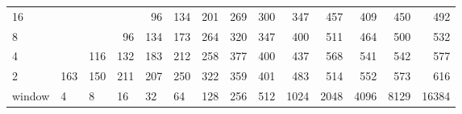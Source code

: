 \begin{table}[h]
{\begin{tabular}{lrrrrrrrrrrrrr}
			\multicolumn{1}{|l|}{16} &  &  &  & \cellcolor[HTML]{99E600}96 & \cellcolor[HTML]{99E600}134 & \cellcolor[HTML]{E69900}201 & \cellcolor[HTML]{E69900}269 & \cellcolor[HTML]{E60000}300 & \cellcolor[HTML]{E60000}347 & \cellcolor[HTML]{9900E6}457 & \cellcolor[HTML]{9900E6}409 & \cellcolor[HTML]{9900E6}450 & \cellcolor[HTML]{9900E6}492 \\ \cline{1-1}
			\multicolumn{1}{|l|}{8} &  &  & \cellcolor[HTML]{99E600}96 & \cellcolor[HTML]{99E600}134 & \cellcolor[HTML]{99E600}173 & \cellcolor[HTML]{E69900}264 & \cellcolor[HTML]{E60000}320 & \cellcolor[HTML]{E60000}347 & \cellcolor[HTML]{9900E6}400 & \cellcolor[HTML]{4C00E6}511 & \cellcolor[HTML]{9900E6}464 & \cellcolor[HTML]{9900E6}500 & \cellcolor[HTML]{4C00E6}532 \\ \cline{1-1}
			\multicolumn{1}{|l|}{4} &  & \cellcolor[HTML]{99E600}116 & \cellcolor[HTML]{99E600}132 & \cellcolor[HTML]{99E600}183 & \cellcolor[HTML]{E69900}212 & \cellcolor[HTML]{E69900}258 & \cellcolor[HTML]{E60000}377 & \cellcolor[HTML]{9900E6}400 & \cellcolor[HTML]{9900E6}437 & \cellcolor[HTML]{4C00E6}568 & \cellcolor[HTML]{4C00E6}541 & \cellcolor[HTML]{4C00E6}542 & \cellcolor[HTML]{4C00E6}577 \\ \cline{1-1}
			\multicolumn{1}{|l|}{2} & \cellcolor[HTML]{99E600}163 & \cellcolor[HTML]{99E600}150 & \cellcolor[HTML]{E69900}211 & \cellcolor[HTML]{E69900}207 & \cellcolor[HTML]{E69900}250 & \cellcolor[HTML]{E60000}322 & \cellcolor[HTML]{E60000}359 & \cellcolor[HTML]{9900E6}401 & \cellcolor[HTML]{9900E6}483 & \cellcolor[HTML]{4C00E6}514 & \cellcolor[HTML]{4C00E6}552 & \cellcolor[HTML]{4C00E6}573 & \cellcolor[HTML]{4C00E6}616 \\ \hline
			\multicolumn{1}{l|}{window} & \multicolumn{1}{l|}{4} & \multicolumn{1}{l|}{8} & \multicolumn{1}{l|}{16} & \multicolumn{1}{l|}{32} & \multicolumn{1}{l|}{64} & \multicolumn{1}{l|}{128} & \multicolumn{1}{l|}{256} & \multicolumn{1}{l|}{512} & \multicolumn{1}{l|}{1024} & \multicolumn{1}{l|}{2048} & \multicolumn{1}{l|}{4096} & \multicolumn{1}{l|}{8129} & \multicolumn{1}{l|}{16384} \\ \cline{2-14} 
		\end{tabular}
	}
\end{table}

